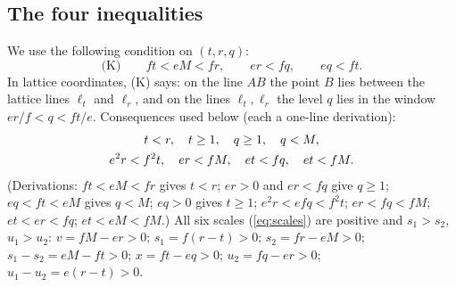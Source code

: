 \documentclass[11pt,reqno]{amsart}
\theoremstyle{plain}
\theoremstyle{definition}
\begin{document}
\subsection{The four inequalities}\label{sub:K}
We use the following condition on $(t,r,q)$:
\begin{equation}\label{eq:K}
\text{(K)}\qquad ft<eM<fr,\qquad er<fq,\qquad eq<ft .
\end{equation}
In lattice coordinates, (K) says: on the line $AB$ the point $B$ lies between the lattice lines $\ell_t$ and $\ell_r$, and on the lines $\ell_t,\ell_r$ the level $q$ lies in the window $er/f<q<ft/e$. Consequences used below (each a one-line derivation):
\begin{gather}
t<r,\quad t\ge1,\quad q\ge1,\quad q<M,\notag\\
e^2r<f^2t,\quad er<fM,\quad et<fq,\quad et<fM.\label{eq:consK}
\end{gather}
(Derivations: $ft<eM<fr$ gives $t<r$; $er>0$ and $er<fq$ give $q\ge1$; $eq<ft<eM$ gives $q<M$; $eq>0$ gives $t\ge1$; $e^2r<efq<f^2t$; $er<fq<fM$; $et<er<fq$; $et<eM<fM$.)
All six scales (\ref{eq:scales}) are positive and $s_1>s_2$, $u_1>u_2$: $v=fM-er>0$; $s_1=f(r-t)>0$; $s_2=fr-eM>0$; $s_1-s_2=eM-ft>0$; $x=ft-eq>0$; $u_2=fq-er>0$; $u_1-u_2=e(r-t)>0$.
\end{document}
